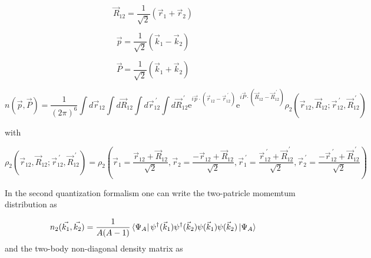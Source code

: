 \documentclass[12pt]{article}
\begin{document}
\begin{equation}
\vec{R}_{12}= \frac{1}{\sqrt{2}} \left(\vec{r}_1 + \vec{r}_2\right)
\end{equation}

\begin{equation}
\vec{p}= \frac{1}{\sqrt{2}} \left(\vec{k}_1 - \vec{k}_2\right)
\end{equation}

\begin{equation}
\vec{P}= \frac{1}{\sqrt{2}} \left(\vec{k}_1 + \vec{k}_2\right)
\end{equation}


\begin{equation}
n(\vec{p},\vec{P})=\frac{1}{(2\pi)^6}
						\int d\vec{r}_{12} \int d\vec{R}_{12} \int d\vec{r}_{12}^{\ \prime} \int d\vec{R}_{12}^{\ \prime} 
    						\mathrm{e}^{i\vec{p}\cdot (\vec{r}_{12}-\vec{r}_{12}^{\ \prime})} 
    						\mathrm{e}^{i\vec{P}\cdot(\vec{R}_{12}-\vec{R}_{12}^{\ \prime})} 
    						\rho_2(\vec{r}_{12},\vec{R}_{12}; \vec{r}_{12}^{\ \prime},\vec{R}_{12}^{\ \prime})
\end{equation}

with

\begin{equation} \label{eq:twobodydensity}
\rho_2(\vec{r}_{12},\vec{R}_{12}; \vec{r}_{12}^{\ \prime},\vec{R}_{12}^{\ \prime}) = 
							\rho_2\left(	
							\vec{r}_1=\frac{\vec{r}_{12} + \vec{R}_{12}}{\sqrt{2}},
							\vec{r}_2=\frac{-\vec{r}_{12} + \vec{R}_{12}}{\sqrt{2}},
						    \vec{r}_1^{\ \prime}=\frac{\vec{r}^{\ \prime}_{12} + \vec{R}^{\ \prime}_{12}}{\sqrt{2}},	
						    \vec{r}_2^{\ \prime}=\frac{-\vec{r}_{12}^{\ \prime} + \vec{R}_{12}^{\ \prime}}{\sqrt{2}}
						    \right)
\end{equation}

In the second quantization formalism one can write the two-patricle momemtum distribution as

\begin{equation}
n_2(\vec{k_1},\vec{k_2})= \frac{1}{A(A-1)}\bra{\Psi_A} \psi^\dagger(\vec{k}_1) \psi^\dagger(\vec{k}_2)  \psi(\vec{k}_1)  \psi(\vec{k}_2)  \ket{\Psi_A}
\end{equation}
and the two-body non-diagonal density matrix as
\end{document}
